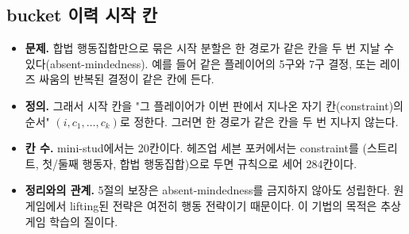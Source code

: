 \subsection{bucket 이력 시작 칸}\label{sec:derived-history}
\begin{itemize}
  \item \textbf{문제.} 합법 행동집합만으로 묶은 시작 분할은 한 경로가 같은 칸을 두 번 지날 수 있다(absent-mindedness). 예를 들어 같은 플레이어의 5구와 7구 결정, 또는 레이즈 싸움의 반복된 결정이 같은 칸에 든다.
  \item \textbf{정의.} 그래서 시작 칸을 "그 플레이어가 이번 판에서 지나온 자기 칸(constraint)의 순서" $(i,c_1,\dots,c_k)$로 정한다. 그러면 한 경로가 같은 칸을 두 번 지나지 않는다.
  \item \textbf{칸 수.} mini-stud에서는 20칸이다. 헤즈업 세븐 포커에서는 constraint를 (스트리트, 첫/둘째 행동자, 합법 행동집합)으로 두면 규칙으로 세어 284칸이다.
  \item \textbf{정리와의 관계.} 5절의 보장은 absent-mindedness를 금지하지 않아도 성립한다. 원 게임에서 lifting된 전략은 여전히 행동 전략이기 때문이다. 이 기법의 목적은 추상 게임 학습의 질이다.
\end{itemize}

